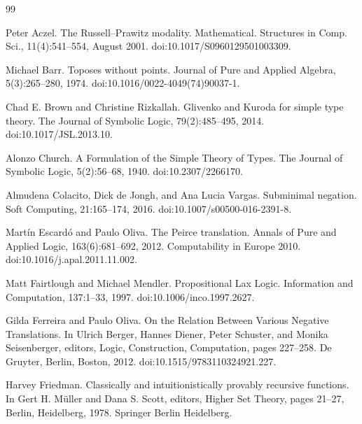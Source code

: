 \begin{thebibliography}{99}
\par\noindent    Peter Aczel.  The Russell–Prawitz modality.  Mathematical. Structures in Comp. Sci., 11(4):541–554, August 2001.  doi:10.1017/S0960129501003309.  

\par\noindent    Michael Barr.  Toposes without points.  Journal of Pure and Applied Algebra, 5(3):265–280, 1974.  doi:10.1016/0022-4049(74)90037-1.  

\par\noindent    Chad E. Brown and Christine Rizkallah.  Glivenko and Kuroda for simple type theory.  The Journal of Symbolic Logic, 79(2):485–495, 2014.  doi:10.1017/JSL.2013.10.  

\par\noindent    Alonzo Church.  A Formulation of the Simple Theory of Types.  The Journal of Symbolic Logic, 5(2):56–68, 1940.  doi:10.2307/2266170.  

\par\noindent    Almudena Colacito, Dick de Jongh, and Ana Lucia Vargas.  Subminimal negation.  Soft Computing, 21:165–174, 2016.  doi:10.1007/s00500-016-2391-8.  

\par\noindent    Martín Escardó and Paulo Oliva.  The Peirce translation.  Annals of Pure and Applied Logic, 163(6):681–692, 2012.  Computability in Europe 2010.  doi:10.1016/j.apal.2011.11.002.  

\par\noindent    Matt Fairtlough and Michael Mendler.  Propositional Lax Logic.  Information and Computation, 137:1–33, 1997.  doi:10.1006/inco.1997.2627.  

\par\noindent    Gilda Ferreira and Paulo Oliva.  On the Relation Between Various Negative Translations.  In Ulrich Berger, Hannes Diener, Peter Schuster, and Monika Seisenberger, editors, Logic, Construction, Computation, pages 227–258. De Gruyter, Berlin, Boston, 2012.  doi:10.1515/9783110324921.227.  

\par\noindent    Harvey Friedman.  Classically and intuitionistically provably recursive functions.  In Gert H. Müller and Dana S. Scott, editors, Higher Set Theory, pages 21–27, Berlin, Heidelberg, 1978. Springer Berlin Heidelberg.  


\end{thebibliography}
